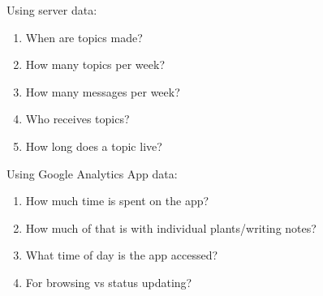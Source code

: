   Using server data:
  \begin{enumerate}
    \item When are topics made?
    \item How many topics per week?
    \item How many messages per week?
    \item Who receives topics?
    \item How long does a topic live?
  \end{enumerate}

  Using Google Analytics App data:
  \begin{enumerate}
    \item How much time is spent on the app?
    \item How much of that is with individual plants/writing notes?
    \item What time of day is the app accessed?
    \item For browsing vs status updating?
  \end{enumerate}
